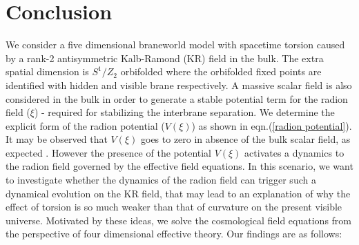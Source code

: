 \documentclass[a4paper]{article}
\begin{document}
\section{Conclusion}
We consider a five dimensional braneworld model with spacetime torsion caused by a rank-2 
antisymmetric Kalb-Ramond (KR) field in the bulk. The extra spatial dimension 
is $S^1/Z_2$ orbifolded where the orbifolded fixed points are identified with hidden and visible brane respectively. A massive scalar field 
is also considered in the bulk in order to generate a stable potential term for the radion field ($\xi$) - required for stabilizing the interbrane 
separation. We determine the explicit form of the radion potential ($V(\xi)$) as shown in eqn.(\ref{radion potential}). It may 
be observed that $V(\xi)$ goes to zero in absence of the bulk scalar field, as expected \cite{GW}. However the presence of the potential $V(\xi)$ 
activates a dynamics to the radion field governed by the effective field equations. In this scenario, we want to investigate 
whether the dynamics of the radion field can trigger such a dynamical evolution on the KR field, that may lead to an explanation of 
why the effect of torsion is so much weaker than that of curvature on the present visible universe. 
Motivated by these ideas, we solve the cosmological field equations from the perspective of 
four dimensional effective theory. Our findings are as follows:\\
\end{document}
